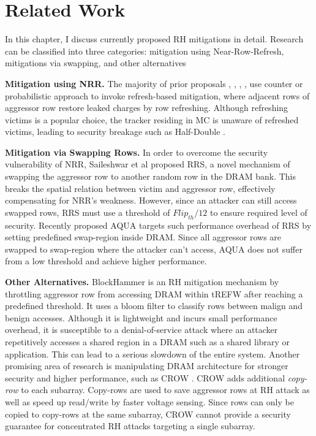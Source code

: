 \chapter{Related Work} \label{sec:related-work}

In this chapter, I discuss currently proposed RH mitigations in detail. Research can be classified into three categories: 
mitigation using Near-Row-Refresh, mitigations via swapping, and other alternatives

\noindent\textbf{Mitigation using NRR.} 
The majority of prior proposals \cite{FlippingBits}, \cite{CBT}, \cite{Hydra}, \cite{TWICE}, 
\cite{Graphene} use counter or probabilistic approach to invoke refresh-based mitigation, where adjacent rows of aggressor row
restore leaked charges by row refreshing. Although refreshing victims is a popular choice, the tracker residing in MC
is unaware of refreshed victims, leading to security breakage such as Half-Double \cite{Half_Double}.  

\noindent\textbf{Mitigation via Swapping Rows.}
In order to overcome the security vulnerability of NRR, Saileshwar et al \cite{RRS} proposed RRS,
a novel mechanism of swapping the aggressor row to another random row in the DRAM bank. 
This breaks the spatial relation between victim and aggressor row, effectively compensating for NRR's weakness. 
However, since an attacker can still access swapped rows, RRS must use a threshold of $Flip_{th}/12$ to ensure required level of security. 
Recently proposed AQUA \cite{AQUA} targets such performance overhead of RRS by setting predefined swap-region inside DRAM. 
Since all aggressor rows are swapped to swap-region where the attacker can't access, AQUA does not suffer from a low threshold
and achieve higher performance. 

\noindent\textbf{Other Alternatives.}
BlockHammer \cite{BlockHammer} is an RH mitigation mechanism by throttling aggressor row from accessing DRAM within tREFW
after reaching a predefined threshold. It uses a bloom filter to classify rows between malign and benign accesses. Although
 it is lightweight and incurs small performance overhead, it is susceptible to a denial-of-service attack where an attacker
 repetitively accesses a shared region in a DRAM such as a shared library or application. This can lead to a serious slowdown of
 the entire system. Another promising area of research is manipulating DRAM architecture for stronger security and higher performance,
 such as CROW \cite{CROW}. CROW adds additional \textit{copy-row} to each subarray. Copy-rows are used to save aggressor rows
 at RH attack as well as speed up read/write by faster voltage sensing. Since rows can only be copied to copy-rows at
 the same subarray, CROW cannot provide a security guarantee for concentrated RH attacks targeting a single subarray. 
